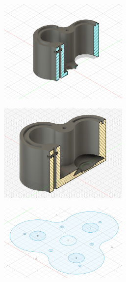 \documentclass[twoside, 11pt]{article}
\begin{document}
\begin{figure}[H]
	\centering
	\begin{subfigure}[b]{0.33\linewidth}
		\centering
		\includegraphics[width=0.7\textwidth]{top_v1}
	\end{subfigure}%
	\begin{subfigure}[b]{0.33\linewidth}
		\centering		
		\includegraphics[width=0.7\textwidth]{bottom_v1}
	\end{subfigure}%
	\begin{subfigure}[b]{0.33\linewidth}
		\centering
		\includegraphics[width=0.7\textwidth]{plate_cad}
	\end{subfigure}
	

\end{figure}
\end{document}
